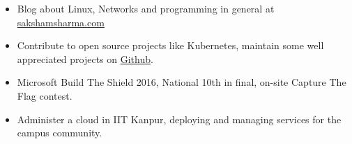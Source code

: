 
{\fontsize{11pt}{1em}\bodyfontlight\upshape\color{text}
\begin{itemize}
  \itemsep-0.3em
  \item Blog about Linux, Networks and programming in
    general at \href{https://sakshamsharma.com}{sakshamsharma.com}
  \item Contribute to open source projects like Kubernetes, maintain some well appreciated
    projects on \href{https://github.com/sakshamsharma}{Github}.
  \item Microsoft Build The Shield 2016, National 10th in final,
    on-site Capture The Flag contest.
  \item Administer a cloud in IIT Kanpur, deploying and managing services for the campus community.
\end{itemize}
}

